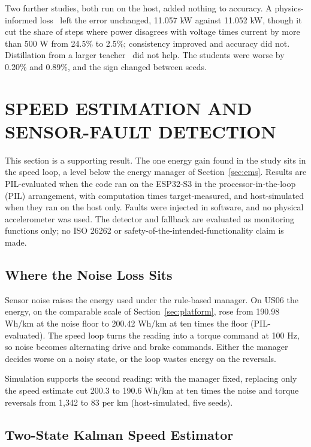 \documentclass{ieeeaccess}
\begin{document}
Two further studies, both run on the host, added nothing to accuracy. A physics-informed loss~\cite{raissi2019} left the error unchanged, 11.057 kW against 11.052 kW, though it cut the share of steps where power disagrees with voltage times current by more than 500 W from 24.5\% to 2.5\%; consistency improved and accuracy did not. Distillation from a larger teacher~\cite{hinton2015} did not help. The students were worse by 0.20\% and 0.89\%, and the sign changed between seeds.

\section{SPEED ESTIMATION AND SENSOR-FAULT DETECTION}
\label{sec:estimation}

This section is a supporting result. The one energy gain found in the study sits in the speed loop, a level below the energy manager of Section~\ref{sec:ems}. Results are PIL-evaluated when the code ran on the ESP32-S3 in the processor-in-the-loop (PIL) arrangement, with computation times target-measured, and host-simulated when they ran on the host only. Faults were injected in software, and no physical accelerometer was used. The detector and fallback are evaluated as monitoring functions only; no ISO 26262 or safety-of-the-intended-functionality claim is made.

\subsection{Where the Noise Loss Sits}

Sensor noise raises the energy used under the rule-based manager. On US06 the energy, on the comparable scale of Section~\ref{sec:platform}, rose from 190.98 Wh/km at the noise floor to 200.42 Wh/km at ten times the floor (PIL-evaluated). The speed loop turns the reading into a torque command at 100 Hz, so noise becomes alternating drive and brake commands. Either the manager decides worse on a noisy state, or the loop wastes energy on the reversals.

Simulation supports the second reading: with the manager fixed, replacing only the speed estimate cut 200.3 to 190.6 Wh/km at ten times the noise and torque reversals from 1,342 to 83 per km (host-simulated, five seeds).

\subsection{Two-State Kalman Speed Estimator}
\end{document}
